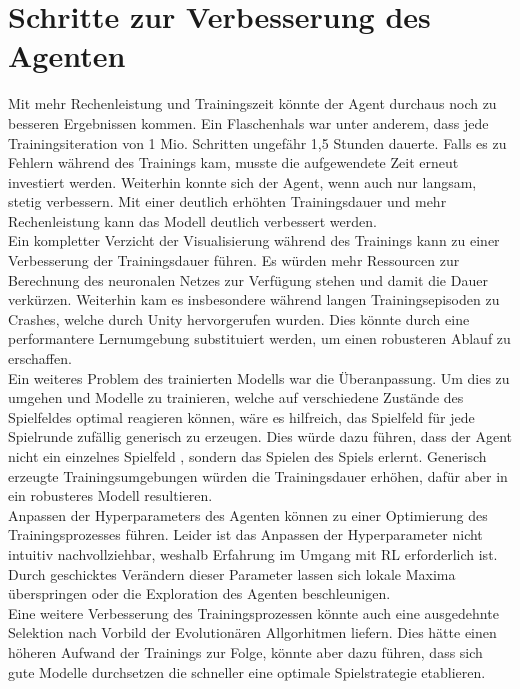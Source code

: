 \section{Schritte zur Verbesserung des Agenten}

Mit mehr Rechenleistung und Trainingszeit könnte der Agent durchaus noch zu besseren Ergebnissen kommen. Ein Flaschenhals war unter anderem, dass jede Trainingsiteration von 1 Mio. Schritten ungefähr 1,5 Stunden dauerte. Falls es zu Fehlern während des Trainings kam, musste die aufgewendete Zeit erneut investiert werden. Weiterhin konnte sich der Agent, wenn auch nur langsam, stetig verbessern. Mit einer deutlich erhöhten Trainingsdauer und mehr Rechenleistung kann das Modell deutlich verbessert werden.\\
Ein kompletter Verzicht der Visualisierung während des Trainings kann zu einer Verbesserung der Trainingsdauer führen. Es würden mehr Ressourcen zur Berechnung des neuronalen Netzes  zur Verfügung stehen und damit die Dauer verkürzen. Weiterhin kam es insbesondere während langen Trainingsepisoden zu Crashes, welche durch Unity hervorgerufen wurden. Dies könnte durch eine performantere Lernumgebung substituiert werden, um einen robusteren Ablauf zu erschaffen. \\
Ein weiteres Problem des trainierten Modells war die Überanpassung. Um dies zu umgehen und Modelle zu trainieren, welche auf verschiedene Zustände des Spielfeldes optimal reagieren können, wäre es hilfreich, das Spielfeld für jede Spielrunde zufällig generisch zu erzeugen. Dies würde dazu führen, dass der Agent nicht ein einzelnes Spielfeld , sondern das Spielen des Spiels erlernt. 
Generisch erzeugte Trainingsumgebungen würden die Trainingsdauer erhöhen, dafür aber in ein robusteres Modell resultieren. \\
Anpassen der Hyperparameters des Agenten können zu einer Optimierung des Trainingsprozesses führen. Leider ist das Anpassen der Hyperparameter nicht intuitiv nachvollziehbar, weshalb Erfahrung im Umgang mit RL erforderlich ist. Durch geschicktes Verändern dieser Parameter lassen sich lokale Maxima überspringen oder die Exploration des Agenten beschleunigen. \\
Eine weitere Verbesserung des Trainingsprozessen könnte auch eine ausgedehnte Selektion nach Vorbild der Evolutionären Allgorhitmen liefern. Dies hätte einen höheren Aufwand der Trainings zur Folge, könnte aber dazu führen, dass sich gute Modelle durchsetzen die schneller eine optimale Spielstrategie etablieren.